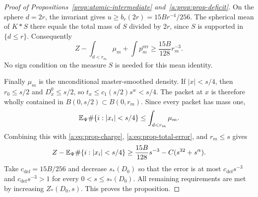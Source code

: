 \begin{proof}[Proof of Propositions~\ref{prop:atomic-intermediate} and~\ref{a:prop:prop-deficit}]
On the sphere $d=2r$, the invariant gives
$u\ge b_r(2r)=15B r^{-4}/256$.  The spherical mean of $K*S$
there equals the total mass of $S$ divided by $2r$, since $S$ is
supported in $\{d\le r\}$.  Consequently
\begin{equation}
\label{a:eq:prop-charge}
 Z-\int_{d<r_m}\mu_m+\int p_m^{\mathrm{err}}
 \ge\frac{15B}{128}r_m^{-3}.
\end{equation}
No sign condition on the measure $S$ is needed for this mean identity.

Finally $\mu_m$ is the unconditional master-smoothed density.
If $|x|<s/4$, then $r_0\le s/2$ and
$D_x^0\le s/2$, so $t_x\le c_1(s/2)s^w<s/4$.
The packet at $x$ is therefore wholly contained in
$B(0,s/2)\subset B(0,r_m)$.  Since every packet has mass one,
\[
 \mathbb E_\Psi\#\{i:|x_i|<s/4\}\le\int_{d<r_m}\mu_m.
\]
Combining this with \eqref{a:eq:prop-charge}, \eqref{a:eq:prop-total-error},
and $r_m\le s$ gives
\[
 Z-\mathbb E_\Psi\#\{i:|x_i|<s/4\}
 \ge\frac{15B}{128}s^{-3}-C(s^{32}+s^\alpha).
\]
Take $c_{\mathrm{def}}=15B/256$ and decrease $s_*(D_0)$ so that
the error is at most $c_{\mathrm{def}}s^{-3}$ and
$c_{\mathrm{def}}s^{-3}>1$ for every $0<s\le s_*(D_0)$.
All remaining requirements are met by increasing $Z_*(D_0,s)$.
This proves the proposition.
\end{proof}
